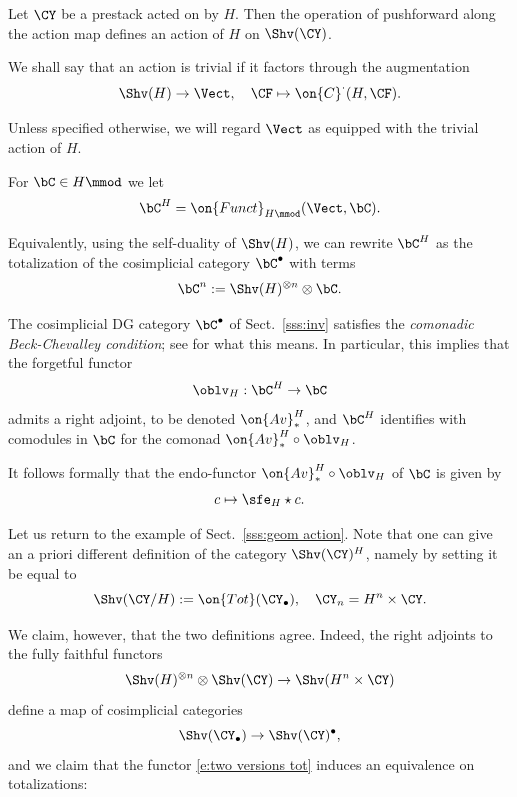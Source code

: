 \documentclass[9pt]{amsart}
\theoremstyle{definition}
\theoremstyle{remark}
\newcommand{\secref}[1]{Sect.~\ref{#1}}
\numberwithin{equation}{section}
\begin{document}
  \label{sss:geom action}

Let $\CY$ be a prestack acted on by $H$. Then the operation of pushforward along the action map
defines an action of $H$ on 
$\Shv(\CY)$. 

\sssec{}   \label{sss:inv}

We shall say that an action is trivial if it factors through the augmentation 
$$\Shv(H)\to \Vect,\quad \CF\mapsto \on{C}^\cdot(H,\CF).$$

\medskip

Unless specified otherwise, we will regard $\Vect$ as equipped with the trivial action of $H$.

\medskip

For $\bC\in H\mmod$ we let 
$$\bC^H=\on{Funct}_{H\mmod}(\Vect,\bC).$$

Equivalently, using the self-duality of $\Shv(H)$, we can rewrite $\bC^H$ as the totalization of the cosimplicial
category $\bC^\bullet$ with terms
$$\bC^n:=\Shv(H)^{\otimes n}\otimes \bC.$$

\sssec{}   \label{sss:Averaging functors}

The cosimplicial DG category $\bC^\bullet$ of \secref{sss:inv} satisfies the \emph{comonadic Beck-Chevalley condition};
see \cite[Defn. C.1.3]{Ga7} for what this means. In particular, this implies that the forgetful functor
$$\oblv_H:\bC^H\to \bC$$
admits a right adjoint, to be denoted $\on{Av}^H_*$, and $\bC^H$ identifies with comodules in $\bC$ for the comonad
$\on{Av}^H_*\circ \oblv_H$. 

\medskip

It follows formally that the endo-functor $\on{Av}^H_*\circ \oblv_H$ of $\bC$ is given by
$$c\mapsto \sfe_H\star c.$$

\sssec{}  \label{sss:inv geom}

Let us return to the example of \secref{sss:geom action}. Note that one can give an a priori different definition 
of the category $\Shv(\CY)^H$, namely by setting it be equal to 
$$\Shv(\CY/H):=\on{Tot}(\CY_\bullet), \quad \CY_n=H^n\times \CY.$$

We claim, however, that the two definitions agree. Indeed, the right adjoints to the fully faithful functors
$$\Shv(H)^{\otimes n}\otimes \Shv(\CY)\to \Shv(H^n\times \CY)$$
define a map of cosimplicial categories
\begin{equation} \label{e:two versions tot}
\Shv(\CY_\bullet)\to \Shv(\CY)^\bullet,
\end{equation}
and we claim that the functor \eqref{e:two versions tot} induces an equivalence on totalizations:
\end{document}
